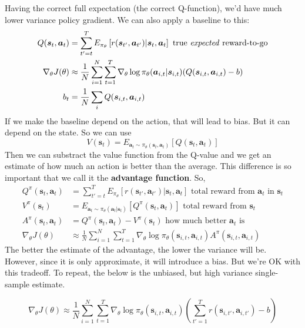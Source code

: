 \documentclass{report}
\begin{document}
Having the correct full expectation (the correct Q-function), we'd have much lower variance policy gradient.
We can also apply a baseline to this:
\begin{align}
		Q(\bm{s}_{t}, \bm{a}_{t}) &= \sum_{t'=t}^{T} E_{\pi_\theta} \left[ r(\bm{s}_{t'}, \bm{a}_{t'}) |\bm{s}_{t}, \bm{a}_{t}  \right] \text{ true \textit{expected} reward-to-go} \\
		\nabla_\theta J(\theta) &\approx \frac{1}{N} \sum_{i=1}^{N} \sum_{t=1}^{T} \nabla_\theta \log \pi_\theta (\bm{a}_{i,t}| \bm{s}_{i,t})
( Q(\bm{s}_{i,t}, \bm{a}_{i,t}) - b) \\
		b_t &= \frac{1}{N} \sum_{i}^{} Q(\bm{s}_{i,t}, \bm{a}_{i,t})
\end{align}
If we make the baseline depend on the action, that will lead to bias.
But it can depend on the state.
So we can use
\begin{equation}
		V(\bm{s}_t) = E_{\bm{a}_t \sim \pi_\theta (\bm{s}_{t}, \bm{a}_{t})} [Q(\bm{s}_{t}, \bm{a}_{t})]
\end{equation}
Then we can substract the value function from the Q-value and we get an estimate of how much
an action is better than the average.
This difference is so important that we call it the \textbf{advantage function}.
So,
\begin{align}
Q^\pi (\bm{s}_{t}, \bm{a}_{t}) & = \sum_{t'=t}^{T} E_{\pi_\theta} \left[ r(\bm{s}_{t'}, \bm{a}_{t'})|\bm{s}_t, \bm{a}_t \right] \text{ total reward from } \bm{a}_t \text{ in } \bm{s}_t\\
V^\pi (\bm{s}_t) &= E_{\bm{a}_t \sim \pi_\theta(\bm{a}_t|\bm{s}_t)} \left[ Q^\pi (\bm{s}_{t}, \bm{a}_{t}) \right]  \text{ total reward from } \bm{s}_t\\
A^\pi (\bm{s}_{t}, \bm{a}_{t}) &= Q^\pi (\bm{s}_{t}, \bm{a}_{t}) - V^\pi (\bm{s}_t)\text{ how much better } \bm{a}_t \text{ is } \\
\nabla_\theta J(\theta) & \approx \frac{1}{N} \sum_{i=1}^{N} \sum_{t=1}^{T} \nabla_{\theta} \log \pi_\theta(\bm{s}_{i,t}, \bm{a}_{i,t}) A^\pi(\bm{s}_{i,t}, \bm{a}_{i,t})
\end{align}
The better the estimate of the advantage, the lower the variance will be.
However, since it is only approximate, it will introduce a bias. But we're OK with this tradeoff.
To repeat, the below is the unbiased, but high variance single-sample estimate.

\begin{equation}
\nabla_\theta J(\theta)  \approx \frac{1}{N} \sum_{i=1}^{N} \sum_{t=1}^{T} \nabla_{\theta} \log \pi_\theta(\bm{s}_{i,t}, \bm{a}_{i,t}) 
\left( \sum_{t'=1}^{T} r(\bm{s}_{i,t'}, \bm{a}_{i,t'}) -b \right) 
\end{equation}
\end{document}
